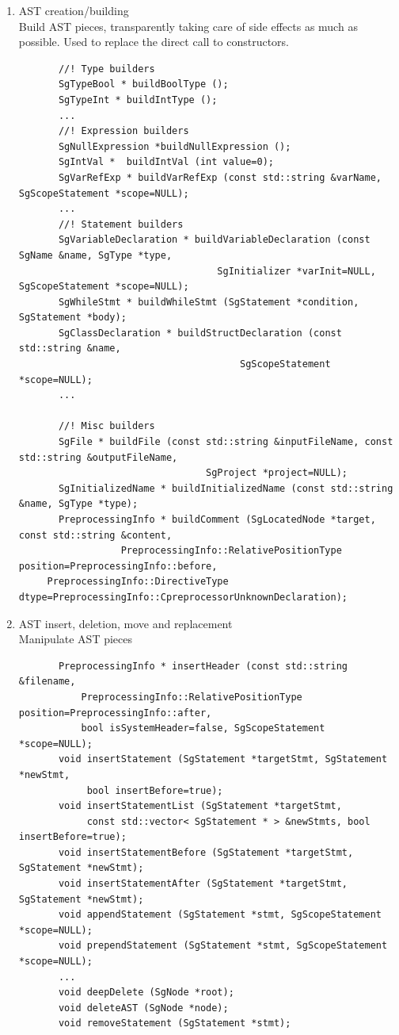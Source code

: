 \begin{enumerate}
\begin{enumerate}
      \item AST creation/building \\      
            Build AST pieces, transparently taking care of side effects as much as possible.
           Used to replace the direct call to constructors. 
       \begin{lstlisting}
       //! Type builders
       SgTypeBool * buildBoolType ();
       SgTypeInt * buildIntType ();
       ...
       //! Expression builders
       SgNullExpression *buildNullExpression ();
       SgIntVal *  buildIntVal (int value=0);
       SgVarRefExp * buildVarRefExp (const std::string &varName, SgScopeStatement *scope=NULL);
       ...
       //! Statement builders
       SgVariableDeclaration * buildVariableDeclaration (const SgName &name, SgType *type, 
                                   SgInitializer *varInit=NULL, SgScopeStatement *scope=NULL);
       SgWhileStmt * buildWhileStmt (SgStatement *condition, SgStatement *body);
       SgClassDeclaration * buildStructDeclaration (const std::string &name, 
                                       SgScopeStatement *scope=NULL); 
       ...

       //! Misc builders
       SgFile * buildFile (const std::string &inputFileName, const std::string &outputFileName, 
                                 SgProject *project=NULL);
       SgInitializedName * buildInitializedName (const std::string &name, SgType *type);
       PreprocessingInfo * buildComment (SgLocatedNode *target, const std::string &content, 
                  PreprocessingInfo::RelativePositionType position=PreprocessingInfo::before, 
     PreprocessingInfo::DirectiveType dtype=PreprocessingInfo::CpreprocessorUnknownDeclaration);
       \end{lstlisting}

      \item AST insert, deletion, move and replacement \\
            Manipulate AST pieces
       \begin{lstlisting}
       PreprocessingInfo * insertHeader (const std::string &filename, 
           PreprocessingInfo::RelativePositionType position=PreprocessingInfo::after, 
           bool isSystemHeader=false, SgScopeStatement *scope=NULL);
       void insertStatement (SgStatement *targetStmt, SgStatement *newStmt, 
            bool insertBefore=true);
       void insertStatementList (SgStatement *targetStmt, 
            const std::vector< SgStatement * > &newStmts, bool insertBefore=true);
       void insertStatementBefore (SgStatement *targetStmt, SgStatement *newStmt);
       void insertStatementAfter (SgStatement *targetStmt, SgStatement *newStmt);
       void appendStatement (SgStatement *stmt, SgScopeStatement *scope=NULL);
       void prependStatement (SgStatement *stmt, SgScopeStatement *scope=NULL);
       ...
       void deepDelete (SgNode *root);
       void deleteAST (SgNode *node);
       void removeStatement (SgStatement *stmt);
       

\end{lstlisting}
\end{enumerate}
\end{enumerate}
